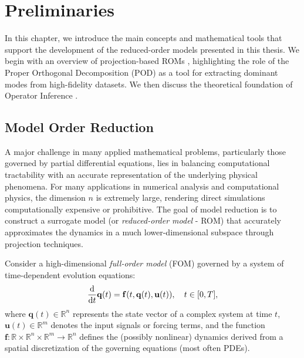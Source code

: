 \chapter{Preliminaries}
\label{chap:preliminar}

In this chapter, we introduce the main concepts and mathematical tools that support the development of the reduced-order models presented in this thesis. We begin with an overview of projection-based ROMs \cite{quarteroni2015reduced}, highlighting the role of the Proper Orthogonal Decomposition (POD) \cite{berkooz1993proper} as a tool for extracting dominant modes from high-fidelity datasets. We then discuss the theoretical foundation of Operator Inference \cite{opinf2025}.




\section{Model Order Reduction}
\label{sec:roms}

A major challenge in many applied mathematical problems, particularly those governed by partial differential equations, lies in balancing computational tractability with an accurate representation of the underlying physical phenomena. For many applications in numerical analysis and computational physics, the dimension \(n\) is extremely large, rendering direct simulations computationally expensive or prohibitive. The goal of model reduction is to construct a surrogate model (or \textit{reduced-order model} - ROM) that accurately approximates the dynamics in a much lower-dimensional subspace through projection techniques.


Consider a high-dimensional \textit{full-order model} (FOM) governed by a system of time-dependent evolution equations:\\
\begin{equation}
    \dv{}{t}\mathbf{q}(t) = \mathbf{f}(t, \mathbf{q}(t), \mathbf{u}(t)), \quad t\in[0,T],
    \label{eq:fom}
\end{equation}
where $\mathbf{q}(t) \in \mathbb{R}^n$ represents the state vector of a complex system at time $t$, $\mathbf{u}(t) \in \mathbb{R}^m$ denotes the input signals or forcing terms, and the function $\mathbf{f}: \mathbb{R} \times \mathbb{R}^n \times \mathbb{R}^m \to \mathbb{R}^n$ defines the (possibly nonlinear) dynamics derived from a spatial discretization of the governing equations (most often PDEs).

